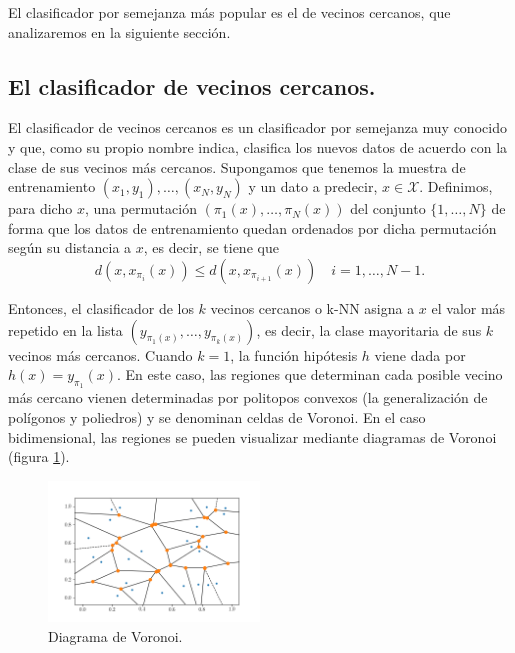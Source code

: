 El clasificador por semejanza más popular es el de vecinos cercanos, que analizaremos en la siguiente sección.

\subsection{El clasificador de vecinos cercanos.}

El clasificador de vecinos cercanos es un clasificador por semejanza muy conocido y que, como su propio nombre indica, clasifica los nuevos datos de acuerdo con la clase de sus vecinos más cercanos. Supongamos que tenemos la muestra de entrenamiento $(x_1,y_1),\dots,(x_N,y_N)$ y un dato a predecir, $x \in \mathcal{X}$. Definimos, para dicho $x$, una permutación $(\pi_1(x),\dots,\pi_N(x))$ del conjunto $\{1,\dots,N\}$ de forma que los datos de entrenamiento quedan ordenados por dicha permutación según su distancia a $x$, es decir, se tiene que
\[ d(x,x_{\pi_i}(x)) \le d(x,x_{\pi_{i+1}}(x)) \quad i=1,\dots,N-1. \]

Entonces, el clasificador de los $k$ vecinos cercanos o k-NN asigna a $x$ el valor más repetido en la lista $(y_{\pi_1(x)},\dots,y_{\pi_k(x)})$, es decir, la clase mayoritaria de sus $k$ vecinos más cercanos. Cuando $k=1$, la función hipótesis $h$ viene dada por $h(x) = y_{\pi_1}(x)$. En este caso, las regiones que determinan cada posible vecino más cercano vienen determinadas por politopos convexos (la generalización de polígonos y poliedros) y se denominan celdas de Voronoi. En el caso bidimensional, las regiones se pueden visualizar mediante diagramas de Voronoi (figura \ref{fig:voronoi}).

\begin{figure}[h]
    \centering
    \includegraphics[width=0.5\textwidth]{./images/voronoi.png}
    \caption{Diagrama de Voronoi.} \label{fig:voronoi}
\end{figure}

